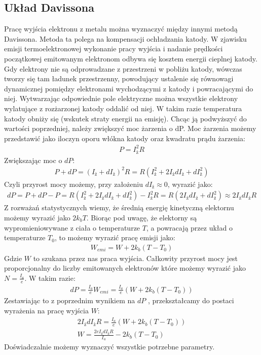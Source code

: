 \documentclass[paper=a4, fontsize=12pt]{scrartcl}
\begin{document}
\subsection{Układ Davissona}
Pracę wyjścia elektronu z metalu można wyznaczyć między innymi metodą Davissona. Metoda ta polega na kompensacji ochładzania katody. W zjawisku emisji termoelektronowej wykonanie pracy wyjścia i nadanie prędkości początkowej emitowanym elektronom odbywa się kosztem energii cieplnej katody. Gdy elektrony nie są odprowadzane z przestrzeni w pobliżu katody, wówczas tworzy się tam ładunek przestrzenny, powodujący ustalenie się równowagi dynamicznej pomiędzy elektronami wychodzącymi z katody i powracającymi do niej. Wytwarzając odpowiednie pole elektryczne można wszystkie elektrony wylatujące z rozżarzonej katody oddalić od niej. W takim razie temperatura katody obniży się (wskutek straty energii na emisję). Chcąc ją podwyższyć do wartości poprzedniej, należy zwiększyć moc żarzenia o dP. Moc żarzenia możemy przedstawić jako iloczyn oporu włókna katody oraz kwadratu prądu żarzenia:
\begin{align*}
P=I_\mathrm{ż}^2R
\end{align*}
Zwiększając moc o $dP$:
\begin{align*}
P+dP=(I_\mathrm{ż}+dI_\mathrm{ż})^2R=R(I_\mathrm{ż}^2+2I_\mathrm{ż}dI_\mathrm{ż}+dI_\mathrm{ż}^2)
\end{align*}
Czyli przyrost mocy możemy, przy założeniu $dI_\mathrm{ż}\approx 0$, wyrazić jako:
\begin{align*}
dP=P+dP-P=R(I_\mathrm{ż}^2+2I_\mathrm{ż}dI_\mathrm{ż}+dI_\mathrm{ż}^2)-I_\mathrm{ż}^2R=R(2I_\mathrm{ż}dI_\mathrm{ż}+dI_\mathrm{ż}^2)\approx2I_\mathrm{ż}dI_\mathrm{ż}R
\end{align*}
Z rozważań statystycznych wiemy, że średnią energię kinetyczną elektornu możemy wyrazić jako $2k_bT$. Biorąc pod uwagę, że elektorny są wypromieniowywane z ciała o temperaturze $T$, a powracają przez układ o temperaturze $T_0$, to możemy wyrazić pracę emisji jako:
\begin{align*}
W_{emi}=W+2k_b(T-T_0)
\end{align*}
Gdzie $W$ to szukana przez nas praca wyjścia. Całkowity przyrost mocy jest proporcjonalny do liczby emitowanych elektronów które możemy wyrazić jako $N=\frac{I_a}{e}$. W takim razie:
\begin{align*}
dP=\frac{I_a}{e}W_{emi}=\frac{I_a}{e}(W+2k_b(T-T_0))
\end{align*}
Zestawiając to z poprzednim wynikiem na $dP$ , przekształcamy do postaci wyrażenia na pracę wyjścia $W$:
\begin{align*}
2I_\mathrm{ż}dI_\mathrm{ż}R=\frac{I_a}{e}(W+2k_b(T-T_0))\\
W=\frac{2eI_\mathrm{ż}dI_\mathrm{ż}R}{I_a}-2k_b(T-T_0)
\end{align*}
Doświadczalnie możemy wyznaczyć wszystkie potrzebne parametry.
\end{document}
